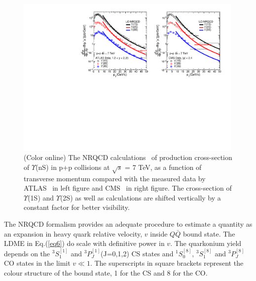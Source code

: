 \begin{figure}
  \centering
  \includegraphics[width=0.99\textwidth]{Figures/Fig4_CMS_ATLAS_YnS_7TeV_Pt.pdf}
  \caption{\small{(Color online) The NRQCD calculations~\cite{Kumar:2021sek} of production cross-section of $\Upsilon$(nS) in
      p+p collisions at $\sqrt{s}$ = 7 TeV, as a function of transverse momentum compared with
      the measured data by ATLAS~\cite{ATLAS:2012lmu} in left figure and CMS~\cite{CMS:2013qur}
      in right figure. The cross-section of $\Upsilon$(1S) and $\Upsilon$(2S) as well as
      calculations are shifted vertically by a constant factor for better visibility.}}
  \label{Fig:SigmaYnSCMS7TeV}
\end{figure}



The NRQCD formalism provides an adequate procedure to estimate a quantity as an expansion in 
heavy quark relative velocity, $v$ inside $Q\bar{Q}$ bound state. The LDME in Eq.(\ref{eq6})
do scale with definitive power in $v$. The quarkonium yield depends on the $^3S_1^{[1]}$ 
and $^3P_J^{[1]}$(J=0,1,2) CS states and $^1S_0^{[8]}$, $^3S_1^{[8]}$ and $^3P_J^{[8]}$
CO states in the limit $v\ll 1$.
The superscripts in square brackets represent the colour structure of the bound state,
1 for the CS and 8 for the CO.





